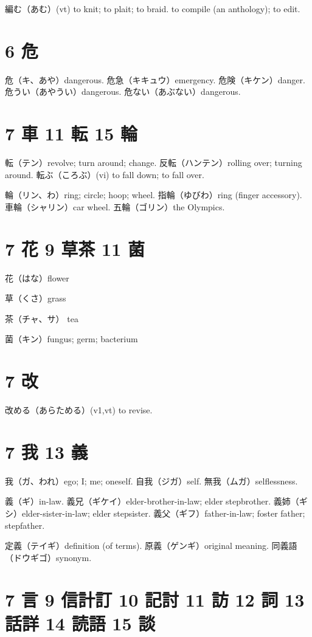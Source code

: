 編む（あむ）(vt)
to knit; to plait; to braid.
to compile (an anthology); to edit.

\section{6 危}

危（キ、あや）dangerous.
危急（キキュウ）emergency.
危険（キケン）danger.
危うい（あやうい）dangerous.
危ない（あぶない）dangerous.

\section{7 車 11 転 15 輪}

転（テン）revolve; turn around; change.
反転（ハンテン）rolling over; turning around.
転ぶ（ころぶ）(vi) to fall down; to fall over.

輪（リン、わ）ring; circle; hoop; wheel.
指輪（ゆびわ）ring (finger accessory).
車輪（シャリン）car wheel.
五輪（ゴリン）the Olympics.

\section{7 花 9 草茶 11 菌}

花（はな）flower

草（くさ）grass

茶（チャ、サ） tea

菌（キン）fungus; germ; bacterium

\section{7 改}

改める（あらためる）(v1,vt) to revise.

\section{7 我 13 義}

我（ガ、われ）ego; I; me; oneself.
自我（ジガ）self.
無我（ムガ）selflessness.

義（ギ）in-law.
義兄（ギケイ）elder-brother-in-law; elder stepbrother.
義姉（ギシ）elder-sister-in-law; elder stepsister.
義父（ギフ）father-in-law; foster father; stepfather.

定義（テイギ）definition (of terms).
原義（ゲンギ）original meaning.
同義語（ドウギゴ）synonym.

\section{7 言 9 信計訂 10 記討 11 訪 12 詞 13 話詳 14 読語 15 談}


